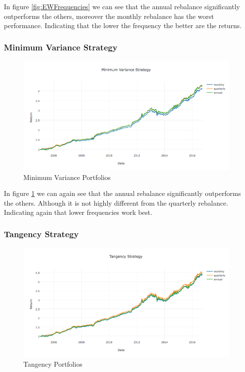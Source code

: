 \documentclass[paper=a4, fontsize=11pt]{scrartcl} %
\numberwithin{equation}{section} %
\numberwithin{figure}{section} %
\numberwithin{table}{section} %
\begin{document}
In figure \ref{fig:EWFrequencies} we can see that the annual rebalance significantly outperforms the others, moreover the monthly rebalance has the worst performance. Indicating that the lower the frequency the better are the returns.

\subsubsection{Minimum Variance Strategy}

\begin{figure}[H]
  \includegraphics[width=\linewidth]{MVFrequencies.png}
  \caption{Minimum Variance Portfolios}
  \label{fig:MVFrequencies}
\end{figure}

In figure \ref{fig:MVFrequencies} we can again see that the annual rebalance significantly outperforms the others. Although it is not highly different from the quarterly rebalance. Indicating again that lower frequencies work best.

\subsubsection{Tangency Strategy}

\begin{figure}[H]
  \includegraphics[width=\linewidth]{TGFrequencies.png}
  \caption{Tangency Portfolios}
  \label{fig:TGFrequencies}
\end{figure}
\end{document}
